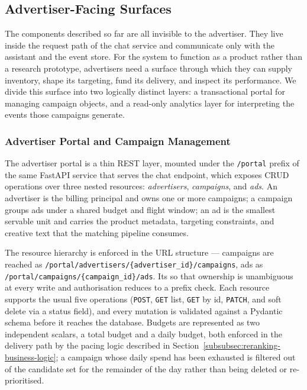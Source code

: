 \subsection{Advertiser-Facing Surfaces}
\label{subsec:advertiser-surfaces}

The components described so far are all invisible to the
advertiser. They live inside the request path of the chat service and
communicate only with the assistant and the event store. For the system
to function as a product rather than a research prototype, advertisers
need a surface through which they can supply inventory, shape its
targeting, fund its delivery, and inspect its performance. We divide this
surface into two logically distinct layers: a transactional portal for
managing campaign objects, and a read-only analytics layer for
interpreting the events those campaigns generate.

\subsubsection{Advertiser Portal and Campaign Management}
\label{subsubsec:advertiser-portal}

The advertiser portal is a thin REST layer, mounted under the
\texttt{/portal} prefix of the same FastAPI service that serves the chat
endpoint, which exposes CRUD operations over three nested resources:
\emph{advertisers}, \emph{campaigns}, and \emph{ads}. An advertiser is
the billing principal and owns one or more campaigns; a campaign groups
ads under a shared budget and flight window; an ad is the smallest
servable unit and carries the product metadata, targeting constraints,
and creative text that the matching pipeline consumes.

The resource hierarchy is enforced in the URL structure --- campaigns
are reached as
\texttt{/portal/advertisers/\{advertiser\_id\}/campaigns}, ads as
\texttt{/portal/campaigns/\{campaign\_id\}/ads}. Its so that ownership is
unambiguous at every write and authorisation reduces to a prefix check.
Each resource supports the usual five operations (\texttt{POST},
\texttt{GET} list, \texttt{GET} by id, \texttt{PATCH}, and soft delete
via a status field), and every mutation is validated against a Pydantic
schema before it reaches the database. Budgets are represented as two
independent scalars, a total budget and a daily budget, both enforced in
the delivery path by the pacing logic described in
Section~\ref{subsubsec:reranking-business-logic}; a campaign whose daily
spend has been exhausted is filtered out of the candidate set for the
remainder of the day rather than being deleted or re-prioritised.

